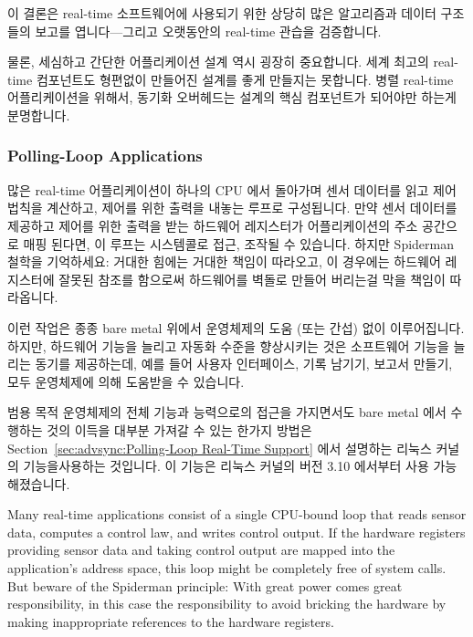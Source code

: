 이 결론은 real-time 소프트웨어에 사용되기 위한 상당히 많은 알고리즘과 데이터
구조들의 보고를 엽니다---그리고 오랫동안의 real-time 관습을 검증합니다.

물론, 세심하고 간단한 어플리케이션 설계 역시 굉장히 중요합니다.
세계 최고의 real-time 컴포넌트도 형편없이 만들어진 설계를 좋게 만들지는
못합니다.
병렬 real-time 어플리케이션을 위해서, 동기화 오버헤드는 설계의 핵심 컴포넌트가
되어야만 하는게 분명합니다.

\subsubsection{Polling-Loop Applications}
\label{sec:advsync:Polling-Loop Applications}

많은 real-time 어플리케이션이 하나의 CPU 에서 돌아가며 센서 데이터를 읽고 제어
법칙을 계산하고, 제어를 위한 출력을 내놓는 루프로 구성됩니다.
만약 센서 데이터를 제공하고 제어를 위한 출력을 받는 하드웨어 레지스터가
어플리케이션의 주소 공간으로 매핑 된다면, 이 루프는 시스템콜로 접근, 조작될 수
있습니다.
하지만 Spiderman 철학을 기억하세요: 거대한 힘에는 거대한 책임이 따라오고, 이
경우에는 하드웨어 레지스터에 잘못된 참조를 함으로써 하드웨어를 벽돌로 만들어
버리는걸 막을 책임이 따라옵니다.

이런 작업은 종종 bare metal 위에서 운영체제의 도움 (또는 간섭) 없이
이루어집니다.
하지만, 하드웨어 기능을 늘리고 자동화 수준을 향상시키는 것은 소프트웨어 기능을
늘리는 동기를 제공하는데, 예를 들어 사용자 인터페이스, 기록 남기기, 보고서
만들기, 모두 운영체제에 의해 도움받을 수 있습니다.

범용 목적 운영체제의 전체 기능과 능력으로의 접근을 가지면서도 bare metal 에서
수행하는 것의 이득을 대부분 가져갈 수 있는 한가지 방법은
Section~\ref{sec:advsync:Polling-Loop Real-Time Support} 에서 설명하는 리눅스
커널의  기능을사용하는 것입니다.
이 기능은 리눅스 커널의 버전 3.10 에서부터 사용 가능해졌습니다.
\iffalse

Many real-time applications consist of a single CPU-bound loop that
reads sensor data, computes a control law, and writes control output.
If the hardware registers providing sensor data and taking control
output are mapped into the application's address space, this loop
might be completely free of system calls.
But beware of the Spiderman principle: With great power comes great
responsibility, in this case the responsibility to avoid bricking the
hardware by making inappropriate references to the hardware registers.

